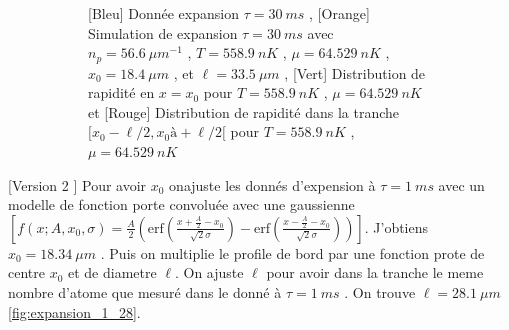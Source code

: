 \documentclass[a3, 10pt,twoside]{article}          %
\theoremstyle{plain}
\theoremstyle{definition}
\theoremstyle{remark}
\theoremstyle{definition} %
\def\OliveGreen{OliveGreen}
\begin{document}
\begin{figure}[h]
\begin{subfigure}[b]{0.45\textwidth}
        		\caption{{\color{blue}[Bleu] Donnée  expansion $\tau = 30~ms$} , {\color{orange}[Orange] Simulation de  expansion $\tau = 30~ms$ avec $n_p = 56.6 ~{\mu m}^{-1}$ , $T = 558.9 ~nK$ , $\mu= 64.529 ~nK$ , $x_0 = 18.4~\mu m$ , et $\ell = 33.5~\mu m$} ,  {\color{\OliveGreen}[Vert] Distribution de rapidité en $x = x_0$ pour  $T = 558.9 ~nK$ , $\mu= 64.529 ~nK$} et {\color{red}[Rouge] Distribution de rapidité dans la tranche  $[x_0 - \ell/2 , x_0à + \ell/2 [ $ pour  $T = 558.9 ~nK$ , $\mu= 64.529 ~nK$}}
        		\label{fig:expansion_30_33}
    		\end{subfigure}
    		\caption{}
			\label{}	
		\end{figure}

	
	[Version 2 ] 
	Pour avoir $x_0$  onajuste les donnés d'expension à $\tau = 1 ~ ms$ avec un modelle de fonction porte convoluée avec une gaussienne  $ \left [ f(x;A, x_0 , \sigma) = \frac{A}{2} \left ( \mbox{erf} \left (  \frac{x + \frac{A}2 - x_0 }{\sqrt{2} \sigma } \right ) - \mbox{erf} \left (  \frac{x - \frac{A}2 - x_0 }{\sqrt{2} \sigma } \right ) \right ) \right ] $. J'obtiens $x_0 = 18.34 ~\mu m$ . Puis on multiplie le profile de bord par une fonction prote de centre $x_0$ et de diametre $\ell$. On  ajuste $\ell$ pour avoir dans la tranche le meme nombre d'atome que mesuré dans le donné à $\tau = 1~ms$ . On trouve $\ell = 28.1 ~\mu m $ \ref{fig:expansion_1_28}.
	
\end{document}
